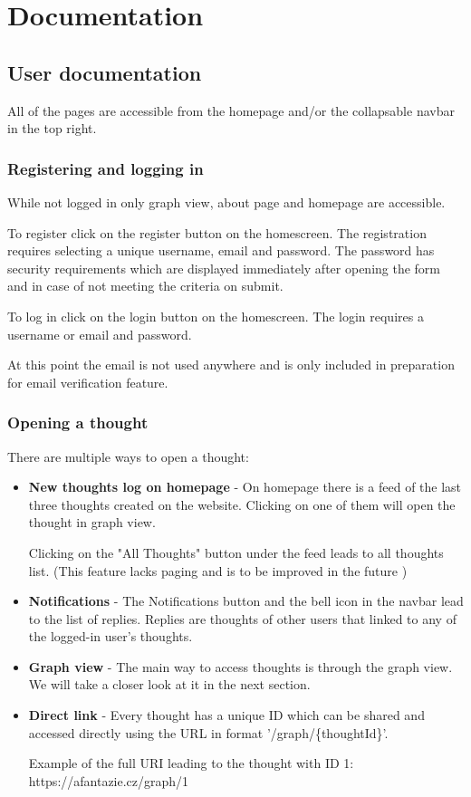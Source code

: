 \chapter{Documentation}

\section{User documentation}
All of the pages are accessible from the homepage and/or the collapsable navbar in the top right.

\subsection{Registering and logging in}
While not logged in only graph view, about page and homepage are accessible.

To register click on the register button on the homescreen. The registration requires selecting a unique username, email and password.
The password has security requirements which are displayed immediately after opening the form and in case of not meeting the criteria on submit.

To log in click on the login button on the homescreen. The login requires a username or email and password.

At this point the email is not used anywhere and is only included in preparation for email verification feature.

\subsection{Opening a thought}
There are multiple ways to open a thought:
\begin{itemize}
  \item \textbf{New thoughts log on homepage} - On homepage there is a feed of the last three thoughts created on the website.
  Clicking on one of them will open the thought in graph view.
  
  Clicking on the "All Thoughts" button under the feed leads to all thoughts list. (This feature lacks paging and is to be improved in the future )
  \item \textbf{Notifications} - The Notifications button and the bell icon in the navbar lead to the list of replies.
  Replies are thoughts of other users that linked to any of the logged-in user's thoughts.
  \item \textbf{Graph view} - The main way to access thoughts is through the graph view. We will take a closer look at it in the next section.
  \item \textbf{Direct link} - Every thought has a unique ID which can be shared and accessed directly using the URL in format '/graph/\{thoughtId\}'.

  Example of the full URI leading to the thought with ID 1: https://afantazie.cz/graph/1
\end{itemize}

